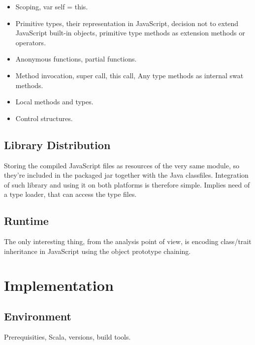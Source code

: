 \documentclass[12pt,a4paper]{report}
\begin{document}
\begin{itemize}
\item Scoping, var self = this.
\item Primitive types, their representation in JavaScript, decision not to extend JavaScript built-in objects, primitive type methods as extension methods or operators.
\item Anonymous functions, partial functions.
\item Method invocation, super call, this call, Any type methods as internal swat methods.
\item Local methods and types.
\item Control structures.
\end{itemize}

\section{Library Distribution}

Storing the compiled JavaScript files as resources of the very same module, so they're included in the packaged jar together with the Java classfiles. Integration of such library and using it on both platforms is therefore simple. Implies need of a type loader, that can access the type files.

\section{Runtime}

The only interesting thing, from the analysis point of view, is encoding class/trait inheritance in JavaScript using the object prototype chaining.








\chapter{Implementation}

\section{Environment}

Prerequisities, Scala, versions, build tools.
\end{document}
